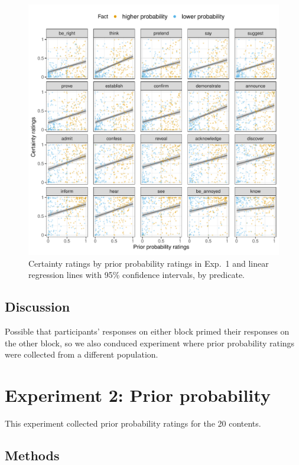 \documentclass[11pt,fleqn]{article}
\newcommand{\6}{\mbox{$[\hspace*{-.6mm}[$}}
\newcommand{\9}{\mbox{$]\hspace*{-.6mm}]$}}
\begin{document}
\begin{figure}[h!]
\centering

\includegraphics[width=.7\paperwidth]{../../results/exp4/graphs/projection-by-prior}

\caption{Certainty ratings by prior probability ratings in Exp.~1 and linear regression lines with 95\% confidence intervals, by predicate.}
\label{f-projection}
\end{figure}

\subsection{Discussion}

Possible that participants' responses on either block primed their responses on the other block, so we also conduced experiment where prior probability ratings were collected from a different population.

\section{Experiment 2: Prior probability}

This experiment collected prior probability ratings for the 20 contents.

\subsection{Methods}
\end{document}
